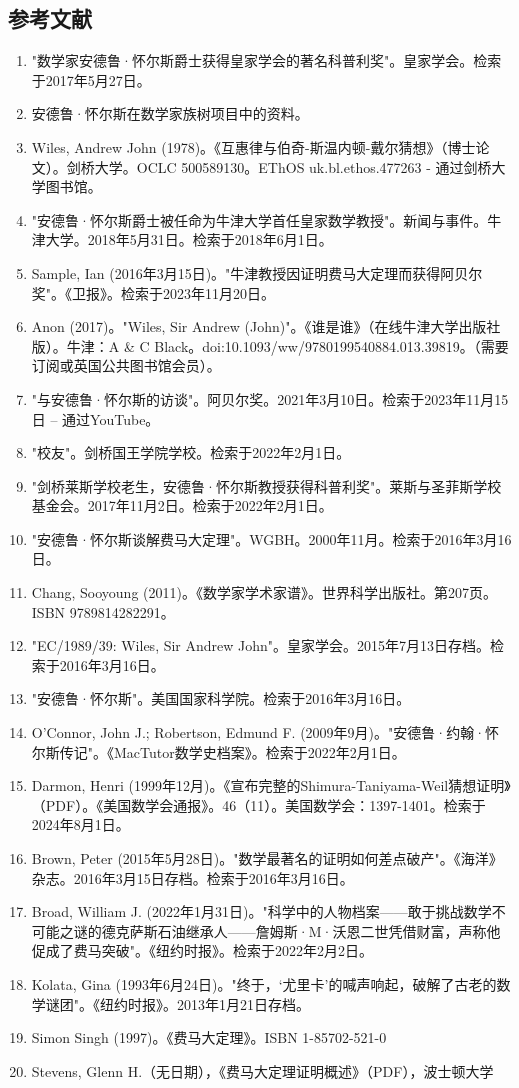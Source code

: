 \subsection{参考文献}  
\begin{enumerate}
\item "数学家安德鲁·怀尔斯爵士获得皇家学会的著名科普利奖"。皇家学会。检索于2017年5月27日。  
\item 安德鲁·怀尔斯在数学家族树项目中的资料。  
\item Wiles, Andrew John (1978)。《互惠律与伯奇-斯温内顿-戴尔猜想》（博士论文）。剑桥大学。OCLC 500589130。EThOS uk.bl.ethos.477263 - 通过剑桥大学图书馆。  
\item "安德鲁·怀尔斯爵士被任命为牛津大学首任皇家数学教授"。新闻与事件。牛津大学。2018年5月31日。检索于2018年6月1日。  
\item Sample, Ian (2016年3月15日)。"牛津教授因证明费马大定理而获得阿贝尔奖"。《卫报》。检索于2023年11月20日。  
\item Anon (2017)。"Wiles, Sir Andrew (John)"。《谁是谁》（在线牛津大学出版社版）。牛津：A & C Black。doi:10.1093/ww/9780199540884.013.39819。（需要订阅或英国公共图书馆会员）。  
\item "与安德鲁·怀尔斯的访谈"。阿贝尔奖。2021年3月10日。检索于2023年11月15日 – 通过YouTube。  
\item "校友"。剑桥国王学院学校。检索于2022年2月1日。  
\item "剑桥莱斯学校老生，安德鲁·怀尔斯教授获得科普利奖"。莱斯与圣菲斯学校基金会。2017年11月2日。检索于2022年2月1日。  
\item "安德鲁·怀尔斯谈解费马大定理"。WGBH。2000年11月。检索于2016年3月16日。  
\item Chang, Sooyoung (2011)。《数学家学术家谱》。世界科学出版社。第207页。ISBN 9789814282291。  
\item "EC/1989/39: Wiles, Sir Andrew John"。皇家学会。2015年7月13日存档。检索于2016年3月16日。  
\item "安德鲁·怀尔斯"。美国国家科学院。检索于2016年3月16日。  
\item O'Connor, John J.; Robertson, Edmund F. (2009年9月)。"安德鲁·约翰·怀尔斯传记"。《MacTutor数学史档案》。检索于2022年2月1日。  
\item Darmon, Henri (1999年12月)。《宣布完整的Shimura-Taniyama-Weil猜想证明》（PDF）。《美国数学会通报》。46（11）。美国数学会：1397-1401。检索于2024年8月1日。  
\item Brown, Peter (2015年5月28日)。"数学最著名的证明如何差点破产"。《海洋》杂志。2016年3月15日存档。检索于2016年3月16日。  
\item Broad, William J. (2022年1月31日)。"科学中的人物档案——敢于挑战数学不可能之谜的德克萨斯石油继承人——詹姆斯·M·沃恩二世凭借财富，声称他促成了费马突破"。《纽约时报》。检索于2022年2月2日。  
\item Kolata, Gina (1993年6月24日)。"终于，‘尤里卡’的喊声响起，破解了古老的数学谜团"。《纽约时报》。2013年1月21日存档。  
\item Simon Singh (1997)。《费马大定理》。ISBN 1-85702-521-0  
\item Stevens, Glenn H.（无日期），《费马大定理证明概述》（PDF），波士顿大学
\end{enumerate}